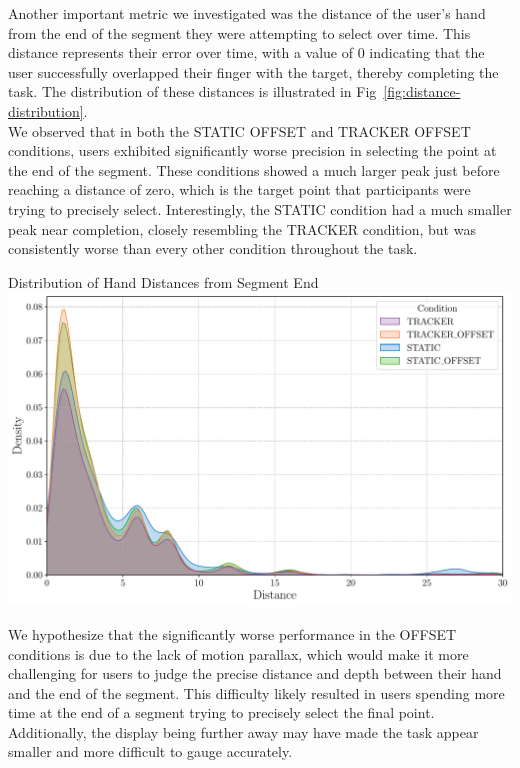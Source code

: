 Another important metric we investigated was the distance of the user's hand from the end of the segment they were attempting to select over time. This distance represents their error over time, with a value of 0 indicating that the user successfully overlapped their finger with the target, thereby completing the task. The distribution of these distances is illustrated in Fig~\ref{fig:distance-distribution}. \\

We observed that in both the STATIC OFFSET and TRACKER OFFSET conditions, users exhibited significantly worse precision in selecting the point at the end of the segment. These conditions showed a much larger peak just before reaching a distance of zero, which is the target point that participants were trying to precisely select. Interestingly, the STATIC condition had a much smaller peak near completion, closely resembling the TRACKER condition, but was consistently worse than every other condition throughout the task. \\

\begin{figureBox}[label={fig:distance-distribution}, width=1.0\linewidth]{Distribution of Hand Distances from Segment End}
    \includegraphics[width = 1.0\linewidth]{./evaluation/figures/survery/distance-distribution.pdf}
\end{figureBox}

We hypothesize that the significantly worse performance in the OFFSET conditions is due to the lack of motion parallax, which would make it more challenging for users to judge the precise distance and depth between their hand and the end of the segment. This difficulty likely resulted in users spending more time at the end of a segment trying to precisely select the final point. Additionally, the display being further away may have made the task appear smaller and more difficult to gauge accurately. \\

